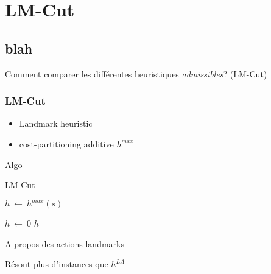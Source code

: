 \section{LM-Cut}
  \subsection*{blah}

\begin{frame}
  \begin{block}{Comment comparer les différentes heuristiques \emph{admissibles}? (LM-Cut)}
      
    
  \end{block}
\end{frame}

\begin{frame}
  \frametitle{LM-Cut}

  \begin{block}{}
    \begin{itemize}
      \item Landmark heuristic
      \item cost-partitioning additive $h^{max}$
    \end{itemize}
  \end{block}

  \begin{block}{Algo}
    \begin{algorithm*}[H]
      \footnotesize
      \caption{LM-Cut}


      $h~←~h^{max}(s)$\;
      
      $h~←~0$\;
      \Return $h$\;


    \end{algorithm*}
  \end{block}
\end{frame}

\begin{frame}
  \begin{block}{A propos des actions landmarks}
    
  \end{block} 
\end{frame}

\begin{frame}
  \begin{block}{}
    \begin{itemize}
      \proitem Résout plus d'instances que $h^{LA}$
    \end{itemize}
  \end{block}
\end{frame}

